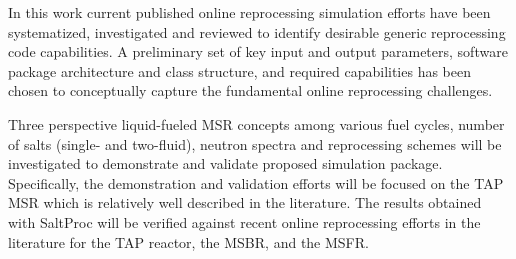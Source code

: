In this work current published online reprocessing simulation efforts 
have been systematized, investigated and reviewed to identify desirable 
generic reprocessing code capabilities. A preliminary set of key input 
and output parameters, software package architecture and class 
structure, and required capabilities has been chosen to conceptually 
capture the fundamental online reprocessing challenges. 

Three perspective liquid-fueled \gls{MSR} concepts among various 
fuel cycles, number of salts (single- and two-fluid), neutron 
spectra and reprocessing schemes will be investigated to 
demonstrate and validate proposed simulation package. Specifically, 
the demonstration and validation efforts will be focused on the \gls{TAP} 
\gls{MSR} which is relatively well described in the literature. 
The results obtained with SaltProc will be verified against 
recent online reprocessing efforts in the literature for the 
\gls{TAP} reactor, the \gls{MSBR}, and the \gls{MSFR}. 